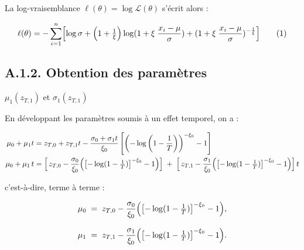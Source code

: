 \documentclass[
  article,
  nofooter,
  noheadings]{jss}
\begin{document}
La log-vraisemblance \(\ell(\theta) = \log \mathcal{L}(\theta)\) s'écrit
alors :

\[
\ell(\theta)=
-\sum_{i=1}^n\Bigl[
\log\sigma
+\Bigl(1+\tfrac1{\xi}\Bigr)\log (1+\xi\;\frac{x_i-\mu}{\sigma})
+(1+\xi\;\frac{x_i-\mu}{\sigma})^{-\frac{1}{\xi}}
\Bigr]
\tag{1}
\]

\subsection*{A.1.2. Obtention des
paramètres}\label{a.1.2.-obtention-des-paramuxe8tres}

\(\mu_1(z_{T,1})\) et \(\sigma_1(z_{T,1})\)

En développant les paramètres soumis à un effet temporel, on a :

\[
\begin{aligned}
\mu_0 + \mu_1 t &= z_{T,0} + z_{T,1} t - \dfrac{\sigma_0 + \sigma_1 t}{\xi_0} \left[ \left( -\log\left(1 - \frac{1}{T} \right) \right)^{-\xi_0} - 1 \right]\\
\mu_0+\mu_1\,t &= \Bigl[\,z_{T,0}
-\dfrac{\sigma_0}{\xi_0}\Bigl(\bigl[-\log(1-\tfrac1T)\bigr]^{-\xi_0}-1\Bigr)
\Bigr]\;+\;\Bigl[\,z_{T,1}-\dfrac{\sigma_1}{\xi_0}\Bigl(\bigl[-\log(1-\tfrac1T)\bigr]^{-\xi_0}-1\Bigr)\Bigr]\,t\\
\end{aligned}
\]

c'est-à-dire, terme à terme :

\[
\begin{aligned}
\mu_0 &\;=\; z_{T,0}
-\dfrac{\sigma_0}{\xi_0}\Bigl(\bigl[-\log(1-\tfrac1T)\bigr]^{-\xi_0}-1\Bigr),\\[0.8em]
\mu_1 &\;=\; z_{T,1}
-\dfrac{\sigma_1}{\xi_0}\Bigl(\bigl[-\log(1-\tfrac1T)\bigr]^{-\xi_0}-1\Bigr).
\end{aligned}
\]
\end{document}
